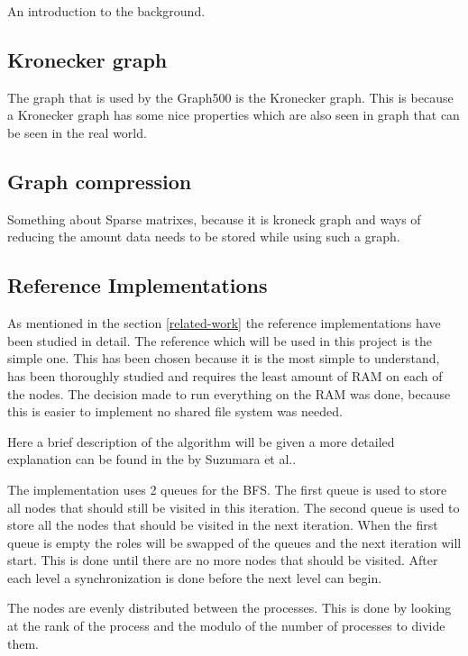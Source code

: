 An introduction to the background.

\subsection{Kronecker graph}
The graph that is used by the Graph500 is the Kronecker graph\cite{leskovec2010kronecker}. This is because a Kronecker graph has some nice properties which are also seen in graph that can be seen in the real world.

\subsection{Graph compression}
Something about Sparse matrixes, because it is kroneck graph and ways of reducing the amount data needs to be stored while using such a graph.

\subsection{Reference Implementations}
As mentioned in the section \ref{related-work} the reference implementations have been studied in detail. The reference which will be used in this project is the  simple one. This has been chosen because it is the most simple to understand, has been thoroughly studied and requires the least amount of RAM on each of the nodes. The decision made to run everything on the RAM was done, because this is easier to implement no shared file system was needed. 

Here a brief description of the algorithm will be given a more detailed explanation can be found in the by Suzumara et al.\cite{suzumura2011performance}.
 
The implementation uses 2 queues for the BFS. The first queue is used to store all nodes that should still be visited in this iteration. The second queue is used to store all the nodes that should be visited in the next iteration. When the first queue is empty the roles will be swapped of the queues and the next iteration will start. This is done until there are no more nodes that should be visited.
After each level a synchronization is done before the next level can begin. 

The nodes are evenly distributed between the processes. This is done by looking at the rank of the process and the modulo of the number of processes to divide them.

